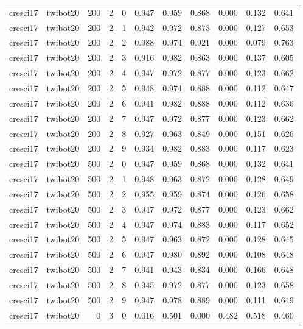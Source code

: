 \begin{tabular}{llrrrrrrrrr}
cresci17 & twibot20 & 200 & 2 & 0 & 0.947 & 0.959 & 0.868 & 0.000 & 0.132 & 0.641 \\
cresci17 & twibot20 & 200 & 2 & 1 & 0.942 & 0.972 & 0.873 & 0.000 & 0.127 & 0.653 \\
cresci17 & twibot20 & 200 & 2 & 2 & 0.988 & 0.974 & 0.921 & 0.000 & 0.079 & 0.763 \\
cresci17 & twibot20 & 200 & 2 & 3 & 0.916 & 0.982 & 0.863 & 0.000 & 0.137 & 0.605 \\
cresci17 & twibot20 & 200 & 2 & 4 & 0.947 & 0.972 & 0.877 & 0.000 & 0.123 & 0.662 \\
cresci17 & twibot20 & 200 & 2 & 5 & 0.948 & 0.974 & 0.888 & 0.000 & 0.112 & 0.647 \\
cresci17 & twibot20 & 200 & 2 & 6 & 0.941 & 0.982 & 0.888 & 0.000 & 0.112 & 0.636 \\
cresci17 & twibot20 & 200 & 2 & 7 & 0.947 & 0.972 & 0.877 & 0.000 & 0.123 & 0.662 \\
cresci17 & twibot20 & 200 & 2 & 8 & 0.927 & 0.963 & 0.849 & 0.000 & 0.151 & 0.626 \\
cresci17 & twibot20 & 200 & 2 & 9 & 0.934 & 0.982 & 0.883 & 0.000 & 0.117 & 0.623 \\
cresci17 & twibot20 & 500 & 2 & 0 & 0.947 & 0.959 & 0.868 & 0.000 & 0.132 & 0.641 \\
cresci17 & twibot20 & 500 & 2 & 1 & 0.948 & 0.963 & 0.872 & 0.000 & 0.128 & 0.649 \\
cresci17 & twibot20 & 500 & 2 & 2 & 0.955 & 0.959 & 0.874 & 0.000 & 0.126 & 0.658 \\
cresci17 & twibot20 & 500 & 2 & 3 & 0.947 & 0.972 & 0.877 & 0.000 & 0.123 & 0.662 \\
cresci17 & twibot20 & 500 & 2 & 4 & 0.947 & 0.974 & 0.883 & 0.000 & 0.117 & 0.652 \\
cresci17 & twibot20 & 500 & 2 & 5 & 0.947 & 0.963 & 0.872 & 0.000 & 0.128 & 0.645 \\
cresci17 & twibot20 & 500 & 2 & 6 & 0.947 & 0.980 & 0.892 & 0.000 & 0.108 & 0.648 \\
cresci17 & twibot20 & 500 & 2 & 7 & 0.941 & 0.943 & 0.834 & 0.000 & 0.166 & 0.648 \\
cresci17 & twibot20 & 500 & 2 & 8 & 0.945 & 0.972 & 0.877 & 0.000 & 0.123 & 0.658 \\
cresci17 & twibot20 & 500 & 2 & 9 & 0.947 & 0.978 & 0.889 & 0.000 & 0.111 & 0.649 \\
cresci17 & twibot20 & 0 & 3 & 0 & 0.016 & 0.501 & 0.000 & 0.482 & 0.518 & 0.460 \\

\end{tabular}
